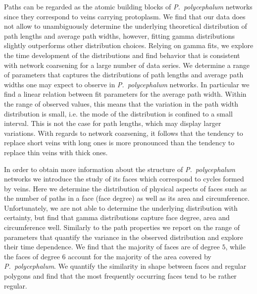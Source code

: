 			Paths can be regarded as the atomic building blocks of \emph{P.~polycephalum} networks since they correspond to veins carrying protoplasm. We find that our data does not allow to unambiguously determine the underlying theoretical distribution of path lengths and average path widths, however, fitting gamma distributions slightly outperforms other distribution choices. Relying on gamma fits, we explore the time development of the distributions and find behavior that is consistent with network coarsening for a large number of data series. We determine a range of parameters that captures the distributions of path lengths and average path widths one may expect to observe in \emph{P.~polycephalum} networks. In particular we find a linear relation between fit parameters for the average path width. Within the range of observed values, this means that the variation in the path width distribution is small, i.e. the mode of the distribution is confined to a small interval. This is not the case for path lengths, which may display larger variations. With regards to network coarsening, it follows that the tendency to replace short veins with long ones is more pronounced than the tendency to replace thin veins with thick ones.

			In order to obtain more information about the structure of \emph{P.~polycephalum} networks we introduce the study of its faces which correspond to cycles formed by veins.	Here we determine the distribution of physical aspects of faces such as the number of paths in a face (face degree) as well as its area and circumference. Unfortunately, we are not able to determine the underlying distribution with certainty, but find that gamma distributions capture face degree, area and circumference well. Similarly to the path properties we report on the range of parameters that quantify the variance in the observed distribution and explore their time dependence. We find that the majority of faces are of degree $5$, while the faces of degree $6$ account for the majority of the area covered by \emph{P.~polycephalum}. We quantify the similarity in shape between faces and regular polygons and find that the most frequently occurring faces tend to be rather regular.

